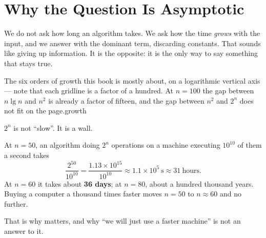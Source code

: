 \section{Why the Question Is Asymptotic}

We do not ask how long an algorithm takes. We ask how the time \emph{grows}
with the input, and we answer with the dominant term, discarding constants.
That sounds like giving up information. It is the opposite: it is the only way
to say something that stays true.

%
{The six orders of growth this book is mostly about, on a logarithmic vertical
axis --- note that each gridline is a factor of a hundred. At $n = 100$ the
gap between $n\lg n$ and $n^2$ is already a factor of fifteen, and the gap
between $n^2$ and $2^n$ does not fit on the page.}{growth}

\begin{alertbox}
$2^n$ is not ``slow''. It is a wall.

\smallskip
At $n = 50$, an algorithm doing $2^n$ operations on a machine executing
$10^{10}$ of them a second takes
\[ \frac{2^{50}}{10^{10}} = \frac{1.13 \times 10^{15}}{10^{10}}
   \approx 1.1 \times 10^{5}\ \text{s} \approx 31\ \text{hours}. \]
At $n = 60$ it takes about \textbf{36 days}; at $n = 80$, about a hundred
thousand years. Buying a computer a thousand times faster moves $n = 50$ to
$n \approx 60$ and no further.

\smallskip
That is why  matters, and why ``we will just use a faster
machine'' is not an answer to it.
\end{alertbox}

